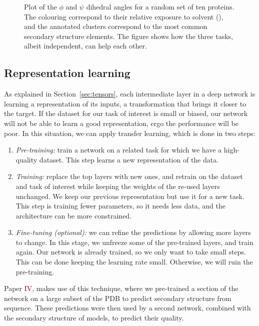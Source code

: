 \begin{figure}[bht]
\centering
\caption{Plot of the $\phi$ and $\psi$ dihedral angles for a random set of ten proteins.
The colouring correspond to their relative exposure to solvent (\RSA),
and the annotated clusters correspond to the most common secondary structure elements.
The figure shows how the three tasks, albeit independent, can help each other. }\label{fig:transfer_learning}
\end{figure}

\subsection{Representation learning}
As explained in Section~\ref{sec:tensors}, each intermediate layer in a deep network is learning a representation of its inputs, a transformation that brings it closer to the target.
If the dataset for our task of interest is small or biased, our network will not be able to learn a good representation, ergo the performance will be poor.
In this situation, we can apply transfer learning, which is done in two steps:
\begin{enumerate}
\item \emph{Pre-training:} train a network on a related task for which we have a high-quality dataset.
This step learns a new representation of the data.
\item \emph{Training:} replace the top layers with new ones, and retrain on the dataset and task of interest while keeping the weights of the re-used layers unchanged.
We keep our previous representation but use it for a new task.
This step is training fewer parameters, so it needs less data, and the architecture can be more constrained.
\item \emph{Fine-tuning (optional):} we can refine the predictions by allowing more layers to change.
In this stage, we unfreeze some of the pre-trained layers, and train again.
Our network is already trained, so we only want to take small steps.
This can be done keeping the learning rate small. Otherwise, we will ruin the pre-training.
\end{enumerate}

Paper \textcolor{Maroon}{IV}, makes use of this technique, where we pre-trained a section of the network on a large subset of the PDB to predict secondary structure from sequence.
These predictions were then used by a second network, combined with the secondary structure of models, to predict their quality.

